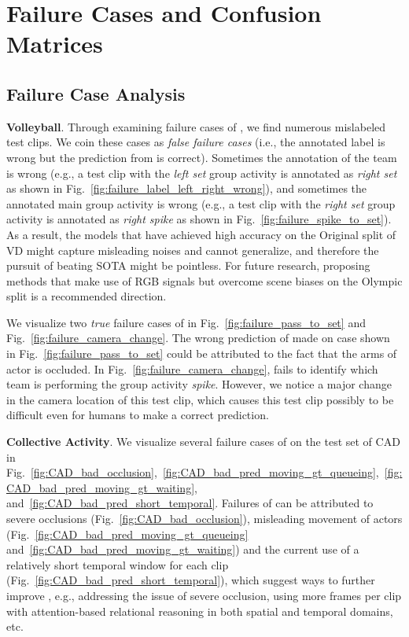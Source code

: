 \documentclass[runningheads]{llncs}
\begin{document}
 

  
 


\renewcommand{\thesection}{E}
\section{Failure Cases and Confusion Matrices}
\label{appendix_sec:failure_cases} 
\subsection{Failure Case Analysis}
\label{appendix_subsec:failure_cases} 
\noindent \textbf{Volleyball}. Through examining failure cases of \ourseos,   we find numerous  mislabeled test clips. We coin these cases as \textit{false failure cases} (i.e., the annotated label is wrong but the prediction from \ours is correct).  
Sometimes the annotation of the team 
is wrong (e.g., a test clip with the \textit{left set} group activity is annotated as \textit{right set} as shown in Fig.~\ref{fig:failure_label_left_right_wrong}), and sometimes the annotated main group activity is wrong (e.g., a test clip with the \textit{right set} group activity is annotated as \textit{right spike} as shown in Fig.~\ref{fig:failure_spike_to_set}). 
As a result, the models that have achieved high accuracy on the Original split of VD might capture misleading noises and cannot generalize, and therefore the pursuit of beating SOTA might be pointless. For future research, proposing methods that make use of RGB signals but overcome scene biases on the Olympic split is a recommended direction.



We visualize two  \textit{true} failure cases of \ours in Fig.~\ref{fig:failure_pass_to_set} and  Fig.~\ref{fig:failure_camera_change}. 
The wrong prediction of \ours made on case shown in Fig.~\ref{fig:failure_pass_to_set}
could be attributed to the fact that the arms of actor  is occluded.
In Fig.~\ref{fig:failure_camera_change}, \ours fails to identify which team is performing the group activity \textit{spike}. However, we notice a major change in the camera location of this test clip, which causes this test clip possibly to be difficult even for humans to make a correct prediction.




 
\noindent \textbf{Collective Activity}.  We visualize
several failure cases of \ours on the test set of CAD in Fig.~\ref{fig:CAD_bad_occlusion},~\ref{fig:CAD_bad_pred_moving_gt_queueing},~\ref{fig:CAD_bad_pred_moving_gt_waiting}, and~\ref{fig:CAD_bad_pred_short_temporal}. Failures of \ours can be attributed to severe occlusions (Fig.~\ref{fig:CAD_bad_occlusion}), misleading movement of actors (Fig.~\ref{fig:CAD_bad_pred_moving_gt_queueing} and~\ref{fig:CAD_bad_pred_moving_gt_waiting}) and the current use of a relatively short temporal window for each clip (Fig.~\ref{fig:CAD_bad_pred_short_temporal}), which suggest ways to further improve \ourseos, e.g., addressing the issue of severe occlusion, using more frames per clip with attention-based relational reasoning in both spatial and temporal domains, etc.
\end{document}
